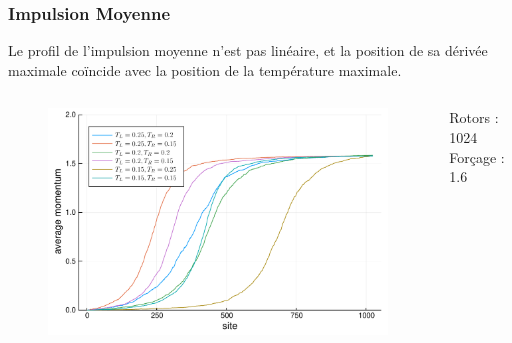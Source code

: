 \begin{frame}

    \frametitle{Impulsion Moyenne}

    Le profil de l'impulsion moyenne n'est pas linéaire, et la
    position de sa dérivée maximale coïncide avec la position de
    la température maximale.

    \begin{columns}

        \begin{column}{0.8\textwidth}
            \begin{figure}
                \includegraphics[scale=0.4]{plots/average_momentum.pdf}
            \end{figure}
        \end{column}

        \begin{column}{0.2\textwidth}
            \scriptsize
            Rotors : 1024
            Forçage : 1.6
        \end{column}

    \end{columns}

\end{frame}

